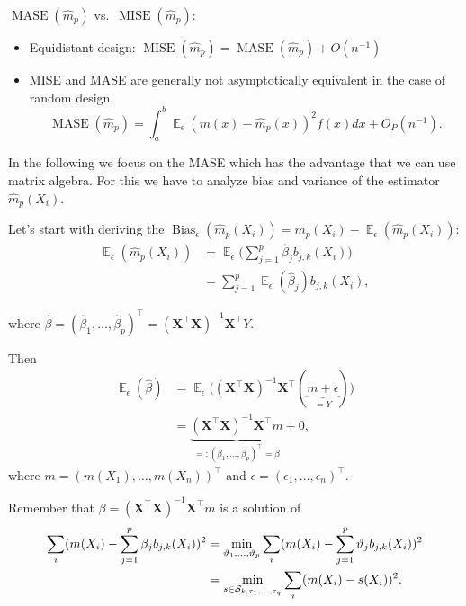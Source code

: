 \documentclass[14pt]{extreport}\usepackage[]{graphicx}\usepackage[]{xcolor}
\DeclareMathOperator{\E}{\mathbb{E}}
\begin{document}
\newpage

$\operatorname{MASE}(\hat m_p)$ vs.~$\operatorname{MISE}(\hat m_p)$:
\begin{itemize}
\item Equidistant design:
$\operatorname{MISE}(\hat m_p)=\operatorname{MASE}(\hat m_p) + O(n^{-1})$
\item MISE and MASE are generally not asymptotically equivalent in the case of random design
$$\operatorname{MASE}(\hat m_p)=\int_a^b \E_\epsilon\left(m(x)-\hat m_p(x)\right)^2 f(x)dx + O_P(n^{-1}).$$
\end{itemize}


\bigskip

In the following we focus on the MASE which has the advantage that we can use matrix algebra. For this we have to analyze bias and variance of the estimator $\hat{m}_p(X_i)$.

\bigskip

Let's start with deriving the $\operatorname{Bias}_\epsilon(\hat{m}_p(X_i))=m_p(X_i)-\E_\epsilon(\hat m_p(X_i))$:
\begin{align*}
  \E_\epsilon(\hat m_p(X_i))&=\E_\epsilon\Big(\sum_{j=1}^p \hat{\beta}_j b_{j,k}(X_i)\Big)\\
 &=\sum_{j=1}^p\E_\epsilon(\hat{\beta}_j) b_{j,k}(X_i),
\end{align*}

where $\hat{\beta}=(\hat{\beta}_1,\dots,\hat{\beta}_p)^\top=(\mathbf{X}^\top\mathbf{X})^{-1}\mathbf{X}^\top Y$.


\bigskip

Then
\begin{align*}
\E_\epsilon(\hat\beta)
&=\E_\epsilon\Big((\mathbf{X}^\top \mathbf{X})^{-1}\mathbf{X}^\top  (\underbrace{m+\epsilon}_{=Y})\Big)\\
&=\underbrace{(\mathbf{X}^\top \mathbf{X})^{-1}\mathbf{X}^\top  m}_{=:(\beta_1,\dots,\beta_p)^\top=\beta}+0,%
\end{align*}
where $m=(m(X_1),\dots, m(X_n))^\top$ and $\epsilon=(\epsilon_1,\dots,\epsilon_n)^\top$.

\bigskip


Remember that $\beta=(\mathbf{X}^\top \mathbf{X})^{-1}\mathbf{X}^\top  m$ is a solution of 
\begin{align*}
\sum_i (m(X_i)-\sum_{j=1}^p \beta_j b_{j,k}(X_i))^2 &=\min_{\vartheta_1,\dots,\vartheta_p}\sum_i (m(X_i)-\sum_{j=1}^p \vartheta_j  b_{j,k}(X_i))^2\\
&=\min_{s\in {\cal{S}}_{k,\tau_1,\dots,\tau_q}} \sum_i (m(X_i)-s(X_i))^2.
\end{align*}
\end{document}
